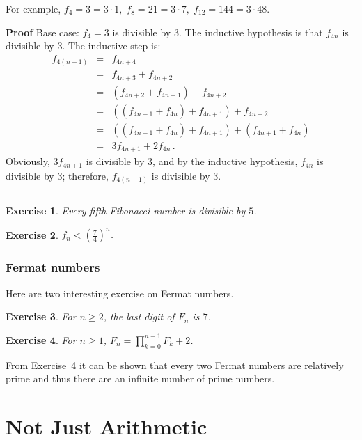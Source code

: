 \documentclass[11pt,a4paper]{report}
\newcommand*{\qed}{\hfill\rule{1ex}{1.5ex}}
\newtheorem{exercise}{Exercise}
\begin{document}
For example, $f_4=3=3\cdot 1,\; f_8=21=3\cdot 7,\; f_{12}=144=3\cdot 48$.

\textbf{Proof} Base case: $f_4=3$ is divisible by $3$. The inductive hypothesis is that $f_{4n}$ is divisible by $3$. The inductive step is:
\begin{eqnarray*}
f_{4(n+1)} &=& f_{4n+4}\\
&=& f_{4n+3}+f_{4n+2}\\
&=& (f_{4n+2}+f_{4n+1})+f_{4n+2}\\
&=& ((f_{4n+1}+f_{4n})+f_{4n+1})+f_{4n+2}\\
&=& ((f_{4n+1}+f_{4n})+f_{4n+1})+(f_{4n+1}+f_{4n})\\
&=& 3f_{4n+1}+2f_{4n}\,.
\end{eqnarray*}
Obviously, $3f_{4n+1}$ is divisible by $3$, and by the inductive hypothesis, $f_{4n}$ is divisible by $3$; therefore, $f_{4(n+1)}$ is divisible by $3$.\qed

\begin{exercise}
Every fifth Fibonacci number is divisible by $5$.
\end{exercise}

\begin{exercise}
$f_n < (\frac{7}{4})^n$.
\end{exercise}

\subsection*{Fermat numbers}

Here are two interesting exercise on Fermat numbers.


\begin{exercise}
For $n\geq 2$, the last digit of $F_n$ is $7$.
\end{exercise}

\begin{exercise}\label{ex.fermat}
For $n\geq 1$, $\displaystyle F_n = \prod_{k=0}^{n-1} F_k + 2$.
\end{exercise}
From Exercise~\ref{ex.fermat} it can be shown that every two Fermat numbers are relatively prime and thus there are an infinite number of prime numbers.


\chapter{Not Just Arithmetic}\label{s.notjust}
\end{document}
